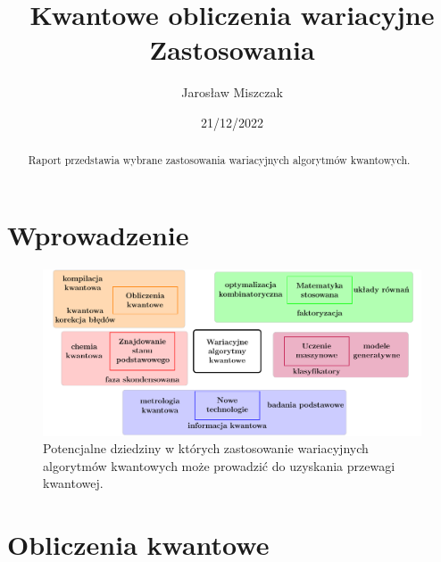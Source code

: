 \documentclass[a4paper,11pt]{article}
\begin{document}
\title{Kwantowe obliczenia wariacyjne\\ {\normalsize Zastosowania}}

\author{Jarosław Miszczak}
\date{21/12/2022}

\maketitle

\begin{abstract}
Raport przedstawia wybrane zastosowania wariacyjnych algorytmów kwantowych. 
\end{abstract}

\tableofcontents

\newpage


\hypertarget{wprowadzenie}{%
\section{Wprowadzenie}\label{wprowadzenie}}



\begin{figure}[ht!]
	\centering
	\includegraphics[width=\textwidth]{vqa-applications-pl}
	\caption{Potencjalne dziedziny w których zastosowanie wariacyjnych algorytmów kwantowych może prowadzić do uzyskania przewagi kwantowej.}
\end{figure}



\newpage 


\section{Obliczenia kwantowe}
\end{document}
